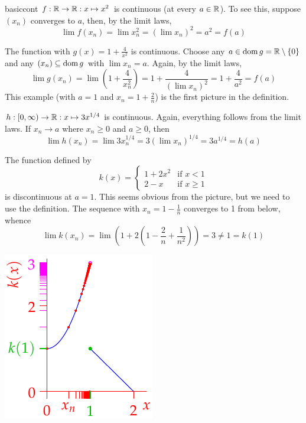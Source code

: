\begin{examples}{}{basiccont}
	\exstart $f:\mathbb{R}\to\mathbb{R}:x\mapsto x^2$ is continuous (at every $a\in\mathbb{R}$). To see this, suppose $(x_n)$ converges to $a$, then, by the limit laws,
  \[\lim f(x_n)=\lim x_n^2=(\lim x_n)^2=a^2=f(a)\]
  
  \begin{enumerate}\setcounter{enumi}{1}
	  \item The function with $g(x)=1+\frac 4{x^2}$ is continuous. Choose any $a\in\operatorname{dom} g=\mathbb{R}\setminus\{0\}$ and any $(x_n)\subseteq\operatorname{dom} g$ with $\lim x_n=a$. Again, by the limit laws,
	  \[\lim g(x_n)=\lim\left(1+\frac 4{x_n^2}\right) =1+\frac 4{(\lim x_n)^2}=1+\frac 4{a^2}=f(a)\]
	  This example (with $a=1$ and $x_n=1+\frac 2n$) is the first picture in the definition.
  
  \item $h:[0,\infty)\to\mathbb{R}:x\mapsto 3x^{1/4}$ is continuous. Again, everything follows from the limit laws. If $x_n\to a$ where $x_n\ge 0$ and $a\ge 0$, then
  \[\lim h(x_n)=\lim 3x_n^{1/4}=3(\lim x_n)^{1/4}=3a^{1/4}=h(a)\]
  
	\begin{minipage}[t]{0.70\linewidth}\vspace{-5pt}
  	\item The function defined by
	  \[
	  	k(x)=
	  	\begin{cases}
	  		1+2x^2&\text{if }x<1\\
	  		2-x&\text{if }x\ge 1
	  	\end{cases}
	  \]
  	is discontinuous at $a=1$. This seems obvious from the picture, but we need to use the definition. The sequence with $x_n=1-\frac 1n$ converges to 1 from below, whence
  	\[\lim k(x_n)=\lim \left(1+2\left(1-\frac 2n+\frac 1{n^2}\right)\right)=3\neq 1=k(1)\]
	\end{minipage}
	\hfill
	\begin{minipage}[t]{0.29\linewidth}\vspace{-5pt}
		\flushright\includegraphics{cont-ex2}
	\end{minipage}



\end{enumerate}
\end{examples}
